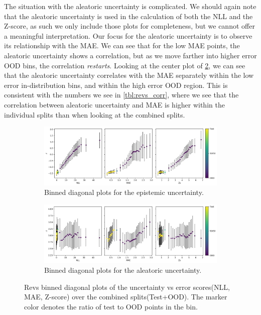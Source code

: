 The situation with the aleatoric uncertainty is complicated. We should again note that the aleatoric uncertainty is used in the calculation of both the NLL and the Z-score, as such we only include those plots for completeness, but we cannot offer a meaningful interpretation. Our focus for the aleatoric uncertainty is to observe its relationship with the MAE. We can see that for the low MAE points, the aleatoric uncertainty shows a correlation, but as we move farther into higher error OOD bins, the correlation \emph{restarts}. Looking at the center plot of \cref{fig:revs_aleatoric_corr}, we can see that the aleatoric uncertainty correlates with the MAE separately within the low error in-distribution bins, and within the high error OOD region.
This is consistent with the numbers we see in \cref{tbl:revs_corr}, where we see that the correlation between aleatoric uncertainty and MAE is higher within the individual splits than when looking at the combined splits.

\begin{figure}[htbp]
  \centering
    \begin{subfigure}[b]{\textwidth}
        \includegraphics[width=\textwidth]{Experiments/figs/binned/revs_crnn_epistemic.png}
        \caption{Binned diagonal plots for the epistemic uncertainty.}
        \label{fig:revs_epistemic_corr}
    \end{subfigure}
    
    \begin{subfigure}[b]{\textwidth}
        \includegraphics[width=\textwidth]{Experiments/figs/binned/revs_crnn_aleatoric.png}
        \caption{Binned diagonal plots for the aleatoric uncertainty.}
    \label{fig:revs_aleatoric_corr}
  \end{subfigure}
    \caption[Revs error-uncertainty diagonal plots for C-RNN]{Revs binned diagonal plots of the  uncertainty vs error scores(NLL, MAE, Z-score) over the combined splits(Test+OOD). The marker color denotes the ratio of test to OOD points in the bin. }
    \label{fig:revs_uncertainty_corr}
\end{figure}


